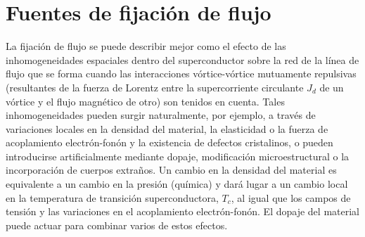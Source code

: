 \documentclass[a4paper,conference]{IEEEtran}
\begin{document}
\section{Fuentes de fijaci\'{o}n de flujo}

La fijaci\'{o}n de flujo se puede describir mejor como el efecto de las
inhomogeneidades espaciales dentro del superconductor sobre la red de la l\'{i}nea
de flujo que se forma cuando las interacciones v\'{o}rtice-v\'{o}rtice mutuamente
repulsivas (resultantes de la fuerza de Lorentz entre la supercorriente
circulante $J_d$ de un v\'{o}rtice y el flujo magn\'{e}tico de otro) son tenidos en
cuenta. Tales inhomogeneidades pueden surgir naturalmente, por ejemplo, a trav\'{e}s
de variaciones locales en la densidad del material, la elasticidad o la fuerza
de acoplamiento electr\'{o}n-fon\'{o}n y la existencia de defectos cristalinos, o pueden
introducirse artificialmente mediante dopaje, modificaci\'{o}n microestructural o la
incorporaci\'{o}n de cuerpos extra\~{n}os. Un cambio en la densidad del material es
equivalente a un cambio en la presi\'{o}n (qu\'{i}mica) y dar\'{a} lugar a un cambio local
en la temperatura de transici\'{o}n superconductora, $T_c$, al igual que los campos de
tensi\'{o}n y las variaciones en el acoplamiento electr\'{o}n-fon\'{o}n. El
dopaje del material puede actuar para combinar varios de estos efectos. 
\end{document}
